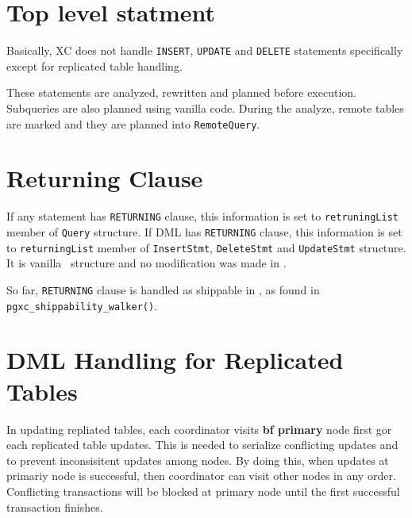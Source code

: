 %
%



\section{\label{sec:insert}Top level statment}

  Basically, XC does not handle {\tt INSERT}, {\tt UPDATE} and {\tt DELETE}
  statements specifically except for replicated table handling.
  
  These statements are analyzed, rewritten and planned before execution.
  Subqueries are also planned using vanilla \PG{} code.
  During the analyze, remote tables are marked and they are planned into {\tt RemoteQuery}.



\section{\label{sec:returning}Returning Clause}

  If any statement has {\tt RETURNING} clause, this information is set to {\tt retruningList}
  member of {\tt Query} structure.
  If DML has {\tt RETURNING} clause, this information is set to {\tt returningList} member of
  {\tt InsertStmt}, {\tt DeleteStmt} and {\tt UpdateStmt} structure.
  It is vanilla \PG~structure and no modification was made in \XC.
  
  So far, {\tt RETURNING} clause is handled as shippable in \XC, as found in
  {\tt pgxc\_shippability\_walker()}.



\section{\label{sec:repTableDML}DML Handling for Replicated Tables}

  In updating repliated tables, 
  each coordinator visits \textbf{bf primary} node first gor each replicated table updates.
  This is needed to serialize conflicting updates and to prevent inconsisitent updates among nodes.
  By doing this, when updates at primariy node is successful, then coordinator can visit
  other nodes in any order.
  Conflicting transactions will be blocked at primary node until the first successful transaction
  finishes.

